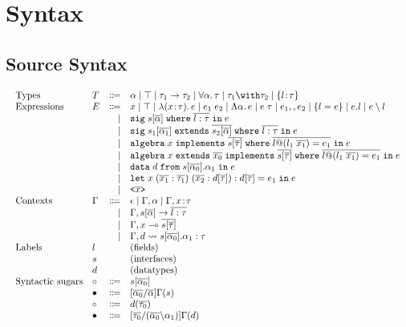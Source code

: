 \documentclass[a4paper]{article}
\begin{document}
\section{Syntax}

\subsection{Source Syntax}

\begin{displaymath}
    \begin{array}{l}
      \begin{array}{llrl}
        \text{Types}
        & T & \Coloneqq & \alpha \mid \top \mid \tau_1 \to \tau_2 \mid \for \alpha \tau \mid \tau_1 \andop \tau_2 \mid \recty l \tau \\
        \text{Expressions}
        & E & \Coloneqq & x \mid \top \mid \lam x \tau e \mid \app {e_1} {e_2} \mid \blam \alpha e \mid \tapp e \tau \mid e_1 \mergeop e_2 \mid \reccon l e \mid e.l \mid e \restrictop l \\
        &   & \mid & \sig s \alpha l \tau e \\
        &   & \mid & \sigext {s_1} {\alpha_1} {s_2} \alpha l \tau e \\
        &   & \mid & \alg x s \tau l {l_1} {x_1} {e_1} e \\
        &   & \mid & \algext x {x_0} s \tau l {l_1} {x_1} {e_1} e \\
        &   & \mid & \data d s {\alpha_0} {\alpha_1} e \\
        &   & \mid & \letexpr {x \; (\overline{x_1} : \overline{\tau_1}) \; (\overline{x_2} : d[\overline{\tau}]) : d[\overline{\tau}]} {e_1} e \\
        &   & \mid & \texttt{<}\overline{x}\texttt{>} \\
        \text{Contexts} & \Gamma & \Coloneqq & \epsilon \mid \Gamma, \alpha \mid \Gamma, x \hast \tau \\
        &   & \mid & \Gamma, s {[} \overline{\alpha} {]}\to\overline{l:\tau} \\
        &   & \mid & \Gamma, x \multimap \overline{s[\overline{\tau}]} \\
        &   & \mid & \Gamma, d \rightsquigarrow s[\overline{\alpha_0}].\alpha_1 : \tau \\
        \text{Labels} & l &  & \text{(fields)} \\
        & s &  & \text{(interfaces)} \\
        & d &  & \text{(datatypes)}\\
        \text{Syntactic sugars} & \circ & \Coloneqq & s[\overline{\alpha_0}] \\
        & \bullet & \Coloneqq & [\overline{\alpha_0}/\overline{\alpha}]\Gamma(s) \\
        & \circ & \Coloneqq & d(\overline{\tau_0}) \\
        & \bullet & \Coloneqq & [\overline{\tau_0}/(\overline{\alpha_0}\backslash\alpha_1)]\Gamma(d)
      \end{array}
    \end{array}
\end{displaymath}
\end{document}
